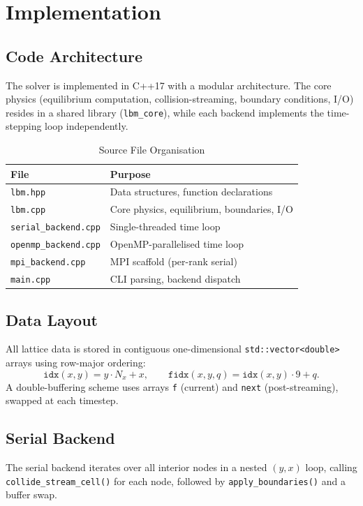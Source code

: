 \documentclass[journal]{IEEEtran}
\begin{document}
\section{Implementation}
\label{sec:impl}

\subsection{Code Architecture}
The solver is implemented in C++17 with a modular architecture.  The
core physics (equilibrium computation, collision-streaming,
boundary conditions, I/O) resides in a shared library
(\texttt{lbm\_core}), while each backend implements the time-stepping
loop independently.

\begin{table}[!t]
\renewcommand{\arraystretch}{1.3}
\caption{Source File Organisation}
\label{tab:files}
\centering
\begin{tabular}{ll}
\toprule
File & Purpose \\
\midrule
\texttt{lbm.hpp} & Data structures, function declarations \\
\texttt{lbm.cpp} & Core physics, equilibrium, boundaries, I/O \\
\texttt{serial\_backend.cpp} & Single-threaded time loop \\
\texttt{openmp\_backend.cpp} & OpenMP-parallelised time loop \\
\texttt{mpi\_backend.cpp} & MPI scaffold (per-rank serial) \\
\texttt{main.cpp} & CLI parsing, backend dispatch \\
\bottomrule
\end{tabular}
\end{table}

\subsection{Data Layout}
All lattice data is stored in contiguous one-dimensional
\texttt{std::vector<double>} arrays using row-major ordering:
\begin{equation}
  \texttt{idx}(x, y) = y \cdot N_x + x, \qquad
  \texttt{fidx}(x, y, q) = \texttt{idx}(x,y) \cdot 9 + q.
\end{equation}
A double-buffering scheme uses arrays \texttt{f} (current) and
\texttt{next} (post-streaming), swapped at each timestep.

\subsection{Serial Backend}
The serial backend iterates over all interior nodes in a nested
$(y, x)$ loop, calling \texttt{collide\_stream\_cell()} for each
node, followed by \texttt{apply\_boundaries()} and a buffer swap.
\end{document}
